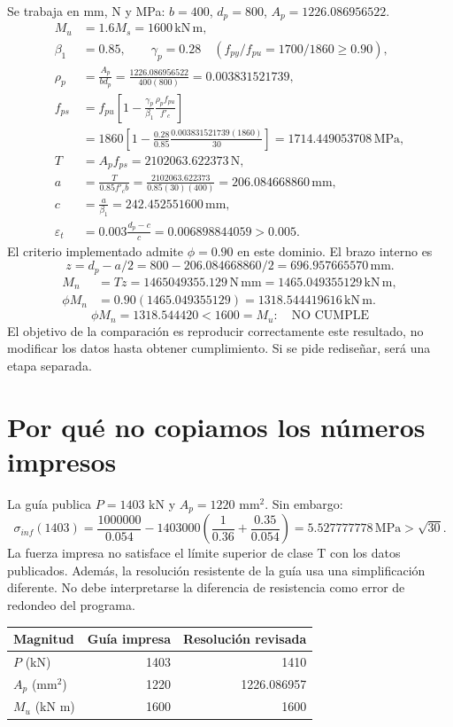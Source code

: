 \documentclass[11pt,a4paper]{article}
\begin{document}
Se trabaja en mm, N y MPa: $b=400$, $d_p=800$, $A_p=1226.086956522$.
\begin{align*}
M_u&=1.6M_s=\boxed{1600\,\mathrm{kN\,m}},\\
\beta_1&=0.85,\qquad \gamma_p=0.28\quad(f_{py}/f_{pu}=1700/1860\geq0.90),\\
\rho_p&=\frac{A_p}{bd_p}=\frac{1226.086956522}{400(800)}=0.003831521739,\\
f_{ps}&=f_{pu}\left[1-\frac{\gamma_p}{\beta_1}\frac{\rho_pf_{pu}}{f'_c}\right]\\
&=1860\left[1-\frac{0.28}{0.85}\frac{0.003831521739(1860)}{30}\right]
=1714.449053708\,\mathrm{MPa},\\
T&=A_pf_{ps}=2102063.622373\,\mathrm N,\\
a&=\frac{T}{0.85f'_cb}=\frac{2102063.622373}{0.85(30)(400)}=206.084668860\,\mathrm{mm},\\
c&=\frac a{\beta_1}=242.452551600\,\mathrm{mm},\\
\varepsilon_t&=0.003\frac{d_p-c}{c}=0.006898844059>0.005.
\end{align*}
El criterio implementado admite $\phi=0.90$ en este dominio. El brazo interno es
\[
z=d_p-a/2=800-206.084668860/2=696.957665570\,\mathrm{mm}.
\]
\begin{align*}
M_n&=Tz=1465049355.129\,\mathrm{N\,mm}=1465.049355129\,\mathrm{kN\,m},\\
\phi M_n&=0.90(1465.049355129)=\boxed{1318.544419616\,\mathrm{kN\,m}}.
\end{align*}
\[
\boxed{\phi M_n=1318.544420<1600=M_u:\quad\text{NO CUMPLE}}
\]
El objetivo de la comparación es reproducir correctamente este resultado, no modificar los datos hasta obtener cumplimiento. Si se pide rediseñar, será una etapa separada.
\newpage
\section{Por qué no copiamos los números impresos}
La guía publica $P=1403$ kN y $A_p=1220$ mm$^2$. Sin embargo:
\[
\sigma_{inf}(1403)=\frac{1000000}{0.054}-1403000\left(\frac1{0.36}+\frac{0.35}{0.054}\right)
=5.527777778\,\mathrm{MPa}>\sqrt{30}.
\]
La fuerza impresa no satisface el límite superior de clase T con los datos publicados. Además, la resolución resistente de la guía usa una simplificación diferente. No debe interpretarse la diferencia de resistencia como error de redondeo del programa.

\begin{center}
\begin{tabular}{lrr}
\toprule
Magnitud & Guía impresa & Resolución revisada\\
\midrule
$P$ (kN)&1403&1410\\
$A_p$ (mm$^2$)&1220&1226.086957\\
$M_u$ (kN m)&1600&1600\\
\bottomrule
\end{tabular}
\end{center}
\end{document}
